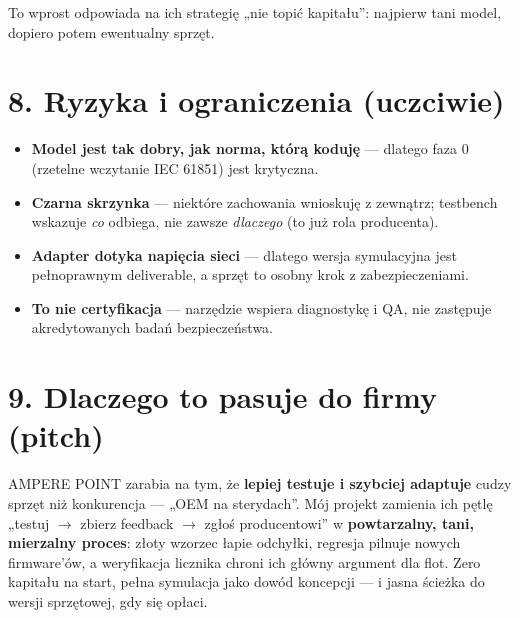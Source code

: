 \documentclass[11pt]{article}
\newcommand{\ra}{$\rightarrow$}
\newcommand{\key}[1]{\textbf{\color{navy}#1}}
\begin{document}
To wprost odpowiada na ich strategię „nie topić kapitału'': najpierw tani model, dopiero potem ewentualny sprzęt.

\section{8. Ryzyka i ograniczenia (uczciwie)}

\begin{itemize}
  \item \key{Model jest tak dobry, jak norma, którą koduję} --- dlatego faza 0 (rzetelne wczytanie IEC 61851) jest krytyczna.
  \item \key{Czarna skrzynka} --- niektóre zachowania wnioskuję z zewnątrz; testbench wskazuje \emph{co} odbiega, nie zawsze \emph{dlaczego} (to już rola producenta).
  \item \key{Adapter dotyka napięcia sieci} --- dlatego wersja symulacyjna jest pełnoprawnym deliverable, a sprzęt to osobny krok z zabezpieczeniami.
  \item \key{To nie certyfikacja} --- narzędzie wspiera diagnostykę i QA, nie zastępuje akredytowanych badań bezpieczeństwa.
\end{itemize}

\section{9. Dlaczego to pasuje do firmy (pitch)}

AMPERE POINT zarabia na tym, że \key{lepiej testuje i szybciej adaptuje} cudzy sprzęt niż konkurencja --- „OEM na sterydach''. Mój projekt zamienia ich pętlę „testuj \ra{} zbierz feedback \ra{} zgłoś producentowi'' w \key{powtarzalny, tani, mierzalny proces}: złoty wzorzec łapie odchyłki, regresja pilnuje nowych firmware'ów, a weryfikacja licznika chroni ich główny argument dla flot. Zero kapitału na start, pełna symulacja jako dowód koncepcji --- i jasna ścieżka do wersji sprzętowej, gdy się opłaci.
\end{document}
